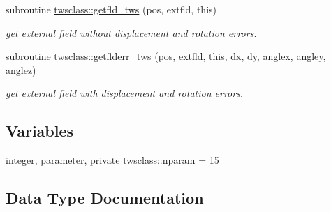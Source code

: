 \begin{DoxyCompactItemize}
subroutine \mbox{\hyperlink{namespacetwsclass_a30d73a1ffc1ce8ce728e8fdf7caa6002}{twsclass\+::getfld\+\_\+tws}} (pos, extfld, this)
\begin{DoxyCompactList}\small\item\em get external field without displacement and rotation errors. \end{DoxyCompactList}\item 
subroutine \mbox{\hyperlink{namespacetwsclass_aaf9be4899e2515903618d2a1ab1dfbbc}{twsclass\+::getflderr\+\_\+tws}} (pos, extfld, this, dx, dy, anglex, angley, anglez)
\begin{DoxyCompactList}\small\item\em get external field with displacement and rotation errors. \end{DoxyCompactList}\end{DoxyCompactItemize}
\subsection*{Variables}
\begin{DoxyCompactItemize}
\item 
integer, parameter, private \mbox{\hyperlink{namespacetwsclass_ae92106a92b2952cbb34ae48df4c6b375}{twsclass\+::nparam}} = 15
\end{DoxyCompactItemize}


\subsection{Data Type Documentation}
\label{structtwsclass_1_1tws}
